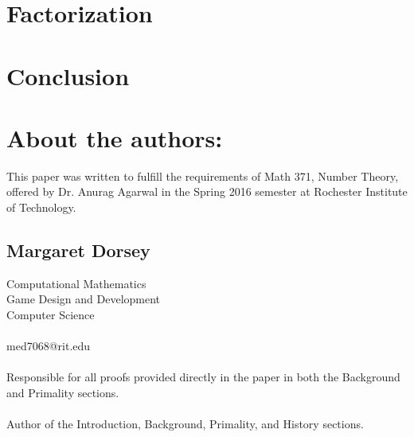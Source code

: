 \documentclass{article}
\begin{document}


\section{Factorization}\label{Factorization}

\section{Conclusion}\label{Conclusion}

\newpage

\nocite{*}
         






\section*{About the authors:}


\par This paper was written to fulfill the requirements of Math 371, Number Theory, offered by Dr. Anurag Agarwal
in the Spring 2016 semester at Rochester Institute of Technology.
\subsection*{Margaret Dorsey}
   Computational Mathematics
   \\Game Design and Development
   \\Computer Science
   \\
   \\ med7068@rit.edu
  \\
  \\ Responsible for all proofs provided directly in the paper in both the Background and Primality sections.
  \\
  \\ Author of the Introduction, Background, Primality, and History sections.
\end{document}
